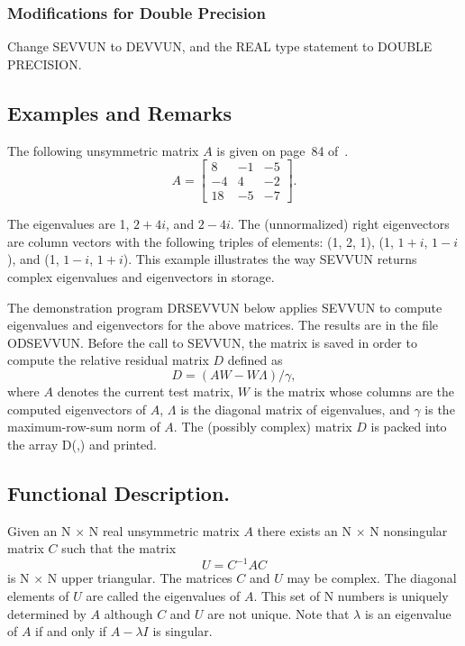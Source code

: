 \documentclass[twoside]{MATH77}
\begin{document}
\subsubsection{Modifications for Double Precision}

Change SEVVUN to DEVVUN, and the REAL type statement to DOUBLE PRECISION.

\subsection{Examples and Remarks}

The following unsymmetric matrix $A$ is
given on page~84 of~\cite{Gregory:1969:ACM}.
\begin{equation*}
A=\left[
\begin{array}{rrr}
8 & -1 & -5 \\
-4 & 4 & -2 \\
18 & -5 & -7
\end{array}
\right] .
\end{equation*}

The eigenvalues are 1, $2+4i$, and $2-4i$. The (unnormalized) right
eigenvectors are column vectors with the following triples of
elements:  (1, 2, 1), (1, $1+i$, $1-i$), and (1, $1-i$, $1+i$).  This
example illustrates the way SEVVUN returns complex eigenvalues and
eigenvectors in storage.

The demonstration program DRSEVVUN below applies SEVVUN to compute
eigenvalues and eigenvectors for the above matrices. The results are
in the file ODSEVVUN. Before the call to SEVVUN, the matrix is saved in
order to compute the relative residual matrix $D$ defined as%
\begin{equation*}
D=\left( AW-W\Lambda \right) /\gamma ,
\end{equation*}
where $A$ denotes the current test matrix, $W$ is the matrix whose columns are
the computed eigenvectors of $A$, $\Lambda $ is the diagonal matrix of
eigenvalues, and $\gamma $ is the maximum-row-sum norm of $A$. The
(possibly complex) matrix $D$ is packed into the array D(,) and printed.

\subsection{Functional Description.}

Given an N $\times $ N real unsymmetric matrix $A$ there exists an N $\times $ N nonsingular
matrix $C$ such that the matrix%
\begin{equation*}
U=C^{-1}AC
\end{equation*}
is N $\times $ N upper triangular. The matrices $C$ and $U$ may be complex. The
diagonal elements of $U$ are called the eigenvalues of $A$. This set of N
numbers is uniquely determined by $A$ although $C$ and $U$ are not unique. Note
that $\lambda $ is an eigenvalue of $A$ if and only if $A-\lambda I$ is
singular.
\end{document}
